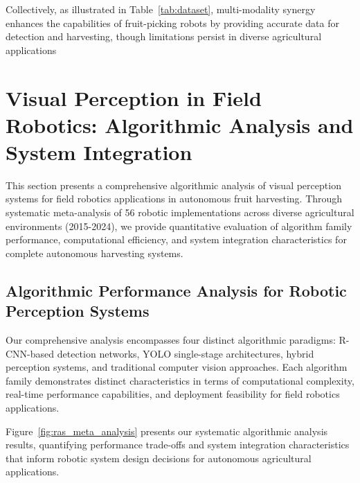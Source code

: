 \documentclass[a4paper,fleqn]{cas-dc}
\begin{document}
Collectively, as illustrated in Table~\ref{tab:dataset}, multi-modality synergy enhances the capabilities of fruit-picking robots by providing accurate data for detection and harvesting, though limitations persist in diverse agricultural applications

\section{Visual Perception in Field Robotics: Algorithmic Analysis and System Integration}
This section presents a comprehensive algorithmic analysis of visual perception systems for field robotics applications in autonomous fruit harvesting. Through systematic meta-analysis of 56 robotic implementations across diverse agricultural environments (2015-2024), we provide quantitative evaluation of algorithm family performance, computational efficiency, and system integration characteristics for complete autonomous harvesting systems.

\subsection{Algorithmic Performance Analysis for Robotic Perception Systems}
Our comprehensive analysis encompasses four distinct algorithmic paradigms: R-CNN-based detection networks, YOLO single-stage architectures, hybrid perception systems, and traditional computer vision approaches. Each algorithm family demonstrates distinct characteristics in terms of computational complexity, real-time performance capabilities, and deployment feasibility for field robotics applications.

Figure~\ref{fig:ras_meta_analysis} presents our systematic algorithmic analysis results, quantifying performance trade-offs and system integration characteristics that inform robotic system design decisions for autonomous agricultural applications.
\end{document}
